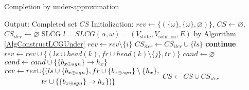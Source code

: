\begin{algorithm}[ht]
\caption{Completion by under-approximation}\label{algComUnder}
\begin{algorithmic}
\State Output: Completed set $CS$ %
\State Initialization: $rev\gets\{(\{\omega\},\{\omega\},\varnothing)\}$, $CS\gets \varnothing$, $CS_{iter}\gets \varnothing$
\Do
\State SLCG $l=SLCG(\alpha,\omega)=(V_{\mathrm{state}},V_{\mathrm{solution}}, E)$ by Algorithm \ref{AlgConstructLCGUnder}
        \State $rev\gets rev \setminus\{i\}$
            \State $CS_{iter}\gets CS_{iter}\cup \{ls\}$
            \State \textbf{continue}
        \EndIf
                    \State $rev\gets rev\cup \{(ls\cup head(k), fr\cup head(k)\setminus \{j\},tr)\}$
                \EndIf
            \EndFor
        \EndFor
        \State $cand\gets\varnothing$
                \State $cand \gets cand\cup\{\acm{b_{x \oplus sgn}}{h_{1-x}}{h_x}\}$
                \State 
                    $\begin{aligned}
                        rev\gets rev\cup &\{(ls\cup \{b_{x \oplus sgn}\}, fr\cup \{b_{x \oplus sgn}\}\setminus \{h_x\},\\
                        &tr\cup\{\acm{b_{x \oplus sgn}}{h_{1-x}}{h_x}\})\}
                    \end{aligned}$
            \EndIf
        \EndFor
    \EndFor
\EndWhile
\State $CS\gets CS\cup CS_{iter}$
\State {}
\end{algorithmic}
\end{algorithm}
